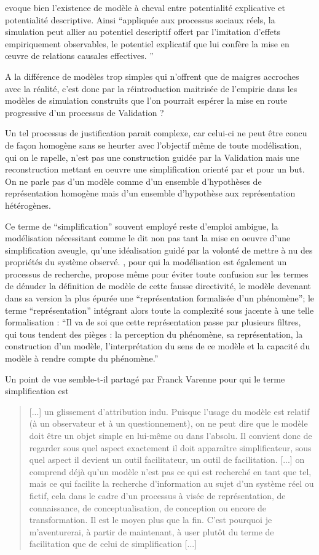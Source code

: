 \textcite{Bulle2005} evoque bien l'existence de modèle à cheval entre potentialité explicative et potentialité descriptive. Ainsi \enquote{appliquée aux processus sociaux réels, la simulation peut allier au potentiel descriptif offert par l’imitation d’effets empiriquement observables, le potentiel explicatif que lui confère la mise en œuvre de relations causales effectives. }

A la différence de modèles trop simples qui n'offrent que de maigres accroches avec la réalité, c'est donc par la réintroduction maitrisée de l'empirie dans les modèles de simulation construits que l'on pourrait espérer la mise en route progressive d'un processus de Validation ?

Un tel processus de justification parait complexe, car celui-ci ne peut être concu de façon homogène sans se heurter avec l'objectif même de toute modélisation, qui on le rapelle, n'est pas une construction guidée par la Validation mais une reconstruction mettant en oeuvre une simplification orienté par et pour un but. On ne parle pas d'un modèle comme d'un ensemble d'hypothèses de représentation homogène mais d'un ensemble d'hypothèse aux représentation hétérogènes.

Ce terme de \enquote{simplification} souvent employé reste d'emploi ambigue, la modélisation nécessitant comme le dit \textcite{Haggett1965} non pas tant la mise en oeuvre d'une simplification aveugle, qu'une idéalisation guidé par la volonté de mettre à nu des propriétés du système observé. \textcite{Brunet2000}, pour qui la modélisation est également un processus de recherche, propose même pour éviter toute confusion sur les termes de dénuder la définition de modèle de cette fausse directivité, le modèle devenant dans sa version la plus épurée une \enquote{représentation formalisée d'un phénomène}; le terme \enquote{représentation} intégrant alors toute la complexité sous jacente à une telle formalisation : \enquote{Il va de soi que cette représentation passe par plusieurs filtres, qui tous tendent des pièges : la perception du phénomène, sa représentation, la construction d'un modèle, l'interprétation du sens de ce modèle et la capacité du modèle à rendre compte du phénomène.}

Un point de vue semble-t-il partagé par Franck Varenne pour qui le terme simplification est \blockquote[{\cite{Varenne2008}}]{[...] un glissement d’attribution indu. Puisque l’usage du modèle est relatif (à un observateur et à un questionnement), on ne peut dire que le modèle doit être un objet simple en lui-même ou dans l’absolu. Il convient donc de regarder sous quel aspect exactement il doit apparaître simplificateur, sous quel aspect il devient un outil facilitateur, un outil de facilitation. [...] on comprend déjà qu’un modèle n’est pas ce qui est recherché en tant que tel, mais ce qui facilite la recherche d’information au sujet d’un système réel ou fictif, cela dans le cadre d’un processus à visée de représentation, de connaissance, de conceptualisation, de conception ou encore de transformation. Il est le moyen plus que la fin. C’est pourquoi je m’aventurerai, à partir de maintenant, à user plutôt du terme de facilitation que de celui de simplification [...]}


